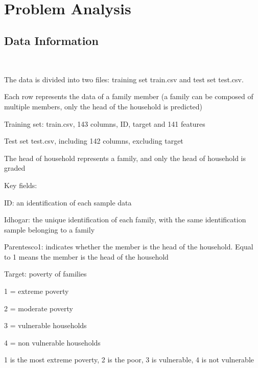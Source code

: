 \


\section{Problem Analysis} \label{sec-data_exploration}

\subsection{Data Information}
\

The data is divided into two files: training set train.csv and test set test.csv.

Each row represents the data of a family member (a family can be composed of multiple members, only the head of the household is predicted)

Training set: train.csv, 143 columns, ID, target and 141 features

Test set test.csv, including 142 columns, excluding target

The head of household represents a family, and only the head of household is graded

Key fields:

ID: an identification of each sample data

Idhogar: the unique identification of each family, with the same identification sample belonging to a family

Parentesco1: indicates whether the member is the head of the household. Equal to 1 means the member is the head of the household

Target: poverty of families

1 = extreme poverty

2 = moderate poverty

3 = vulnerable households

4 = non vulnerable households

1 is the most extreme poverty, 2 is the poor, 3 is vulnerable, 4 is not vulnerable


